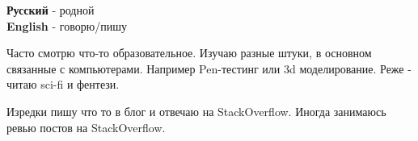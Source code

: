 \documentclass[10pt]{tpl/developercv} %
\begin{document}

\begin{minipage}[t]{0.3\textwidth}
	\vspace{-\baselineskip} %


	\textbf{Русский} - родной\\
	\textbf{English} - говорю/пишу\\
\end{minipage}
\hfill
\begin{minipage}[t]{0.3\textwidth}
	\vspace{-\baselineskip} %


	Часто смотрю что-то образовательное. Изучаю разные штуки, в основном связанные с компьютерами. Например Pen-тестинг или 3d моделирование.
	Реже - читаю sci-fi и фентези.
\end{minipage}
\hfill
\begin{minipage}[t]{0.3\textwidth}
	\vspace{-\baselineskip} %


	Изредки пишу что то в блог и отвечаю на StackOverflow. Иногда занимаюсь ревью постов на StackOverflow.
\end{minipage}

\end{document}
